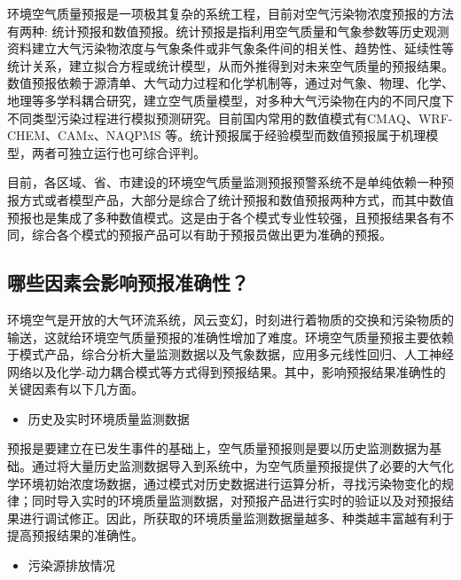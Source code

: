 \documentclass[]{book}
\providecommand{\tightlist}{%
  \setlength{\itemsep}{0pt}\setlength{\parskip}{0pt}}
\begin{document}
环境空气质量预报是一项极其复杂的系统工程，目前对空气污染物浓度预报的方法有两种: 统计预报和数值预报。统计预报是指利用空气质量和气象参数等历史观测资料建立大气污染物浓度与气象条件或非气象条件间的相关性、趋势性、延续性等统计关系，建立拟合方程或统计模型，从而外推得到对未来空气质量的预报结果。数值预报依赖于源清单、大气动力过程和化学机制等，通过对气象、物理、化学、地理等多学科耦合研究，建立空气质量模型，对多种大气污染物在内的不同尺度下不同类型污染过程进行模拟预测研究。目前国内常用的数值模式有CMAQ、WRF-CHEM、CAMx、NAQPMS 等。统计预报属于经验模型而数值预报属于机理模型，两者可独立运行也可综合评判。

目前，各区域、省、市建设的环境空气质量监测预报预警系统不是单纯依赖一种预报方式或者模型产品，大部分是综合了统计预报和数值预报两种方式，而其中数值预报也是集成了多种数值模式。这是由于各个模式专业性较强，且预报结果各有不同，综合各个模式的预报产品可以有助于预报员做出更为准确的预报。

\hypertarget{ux54eaux4e9bux56e0ux7d20ux4f1aux5f71ux54cdux9884ux62a5ux51c6ux786eux6027}{%
\subsection{哪些因素会影响预报准确性？}\label{ux54eaux4e9bux56e0ux7d20ux4f1aux5f71ux54cdux9884ux62a5ux51c6ux786eux6027}}

环境空气是开放的大气环流系统，风云变幻，时刻进行着物质的交换和污染物质的输送，这就给环境空气质量预报的准确性增加了难度。环境空气质量预报主要依赖于模式产品，综合分析大量监测数据以及气象数据，应用多元线性回归、人工神经网络以及化学-动力耦合模式等方式得到预报结果。其中，影响预报结果准确性的关键因素有以下几方面。

\begin{itemize}
\tightlist
\item
  历史及实时环境质量监测数据
\end{itemize}

预报是要建立在已发生事件的基础上，空气质量预报则是要以历史监测数据为基础。通过将大量历史监测数据导入到系统中，为空气质量预报提供了必要的大气化学环境初始浓度场数据，通过模式对历史数据进行运算分析，寻找污染物变化的规律；同时导入实时的环境质量监测数据，对预报产品进行实时的验证以及对预报结果进行调试修正。因此，所获取的环境质量监测数据量越多、种类越丰富越有利于提高预报结果的准确性。

\begin{itemize}
\tightlist
\item
  污染源排放情况
\end{itemize}
\end{document}

